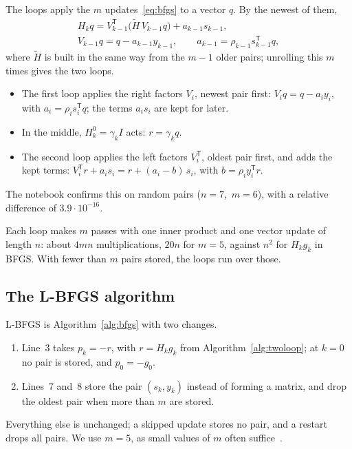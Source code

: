 \documentclass[11pt,a4paper]{amsart}
\numberwithin{equation}{section}
\theoremstyle{plain}
\theoremstyle{definition}
\theoremstyle{remark}
\newcommand{\T}{\mathsf{T}}
\begin{document}
The loops apply the $m$ updates~\eqref{eq:bfgs} to a vector $q$. By
the newest of them,
\begin{gather*}
  H_k q = V_{k-1}^\T \bigl(\tilde H\, V_{k-1} q\bigr) + a_{k-1} s_{k-1}, \\
  V_{k-1} q = q - a_{k-1} y_{k-1}, \qquad a_{k-1} = \rho_{k-1} s_{k-1}^\T q,
\end{gather*}
where $\tilde H$ is built in the same way from the $m - 1$ older pairs;
unrolling this $m$ times gives the two loops.
\begin{itemize}[leftmargin=*, nosep]
\item The first loop applies the right factors $V_i$, newest pair
  first: $V_i q = q - a_i y_i$, with $a_i = \rho_i s_i^\T q$; the terms
  $a_i s_i$ are kept for later.
\item In the middle, $H_k^0 = \gamma_k I$ acts: $r = \gamma_k q$.
\item The second loop applies the left factors $V_i^\T$, oldest pair
  first, and adds the kept terms: $V_i^\T r + a_i s_i
  = r + (a_i - b)\, s_i$, with $b = \rho_i y_i^\T r$.
\end{itemize}
The notebook confirms this on random pairs ($n = 7$,~$m = 6$), with a
relative difference of $3.9 \cdot 10^{-16}$.

Each loop makes $m$ passes with one inner product and one vector update
of length $n$: about $4mn$ multiplications, $20n$ for $m = 5$, against
$n^2$ for $H_k g_k$ in BFGS. With fewer than $m$ pairs stored, the loops
run over those.

\subsection{The L-BFGS algorithm}\label{sec:lbfgs-alg}

L-BFGS is Algorithm~\ref{alg:bfgs} with two changes.
\begin{enumerate}[leftmargin=*, nosep]
\item Line~3 takes $p_k = -r$, with $r = H_k g_k$ from
  Algorithm~\ref{alg:twoloop}; at $k = 0$ no pair is stored, and
  $p_0 = -g_0$.
\item Lines~7 and~8 store the pair $(s_k, y_k)$ instead of forming a
  matrix, and drop the oldest pair when more than $m$ are stored.
\end{enumerate}
Everything else is unchanged; a skipped update stores no pair, and a
restart drops all pairs. We use $m = 5$, as small values of $m$ often
suffice~\cite[\S7.2]{nocedal2006}.
\end{document}
